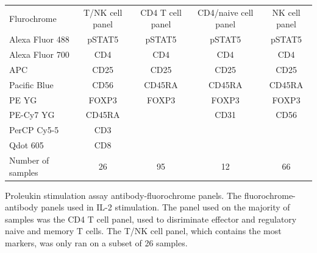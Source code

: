 \begin{table}[h!]\footnotesize
  \centering
\begin{tabularx}{\textwidth}{lcccc}
\rowcolor{Gray}
Flurochrome       & T/NK cell panel & CD4 T cell panel & CD4/naive cell panel & NK cell panel \\
Alexa Fluor 488   & pSTAT5          & pSTAT5           & pSTAT5               & pSTAT5  \\
Alexa Fluor 700   & CD4             & CD4              & CD4                  & CD4     \\
APC               & CD25            & CD25             & CD25                 & CD25    \\
Pacific Blue      & CD56            & CD45RA           & CD45RA               & CD45RA  \\
PE YG             & FOXP3           & FOXP3            & FOXP3                & FOXP3   \\
PE-Cy7 YG         & CD45RA          &                  & CD31                 & CD56    \\
PerCP Cy5-5       & CD3             &                  &                      & \\
Qdot 605          & CD8             &                  &                      & \\
\hline
Number of samples & 26              & 95               & 12                   & 66 \\
\end{tabularx}
{Proleukin stimulation assay antibody-fluorochrome panels.}
{
The fluorochrome-antibody panels used in IL-2 stimulation.
The panel used on the majority of samples was the CD4 T cell panel, used to disriminate
effector and regulatory naive and memory T cells.
The T/NK cell panel, which contains the most markers, was only ran on a subset of 26 samples.
}
\end{table}
%


